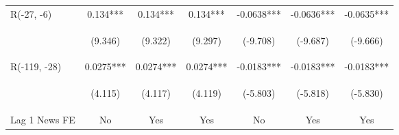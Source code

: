 \documentclass[border=0.2cm]{standalone}
\begin{document}
\begin{tabular}{lcccccc}
    R(-27, -6)        & 0.134***                                       & 0.134***                                       & 0.134***                                       & -0.0638***                                     & -0.0636***                                     & -0.0635***                                     \\
    \vspace{4pt}      & \begin{footnotesize}(9.346)\end{footnotesize}  & \begin{footnotesize}(9.322)\end{footnotesize}  & \begin{footnotesize}(9.297)\end{footnotesize}  & \begin{footnotesize}(-9.708)\end{footnotesize} & \begin{footnotesize}(-9.687)\end{footnotesize} & \begin{footnotesize}(-9.666)\end{footnotesize} \\
    R(-119, -28)      & 0.0275***                                      & 0.0274***                                      & 0.0274***                                      & -0.0183***                                     & -0.0183***                                     & -0.0183***                                     \\
    \vspace{4pt}      & \begin{footnotesize}(4.115)\end{footnotesize}  & \begin{footnotesize}(4.117)\end{footnotesize}  & \begin{footnotesize}(4.119)\end{footnotesize}  & \begin{footnotesize}(-5.803)\end{footnotesize} & \begin{footnotesize}(-5.818)\end{footnotesize} & \begin{footnotesize}(-5.830)\end{footnotesize} \\
    Lag 1 News FE     & No                                             & Yes                                            & Yes                                            & No                                             & Yes                                            & Yes                                            \\

\end{tabular}
\end{document}
